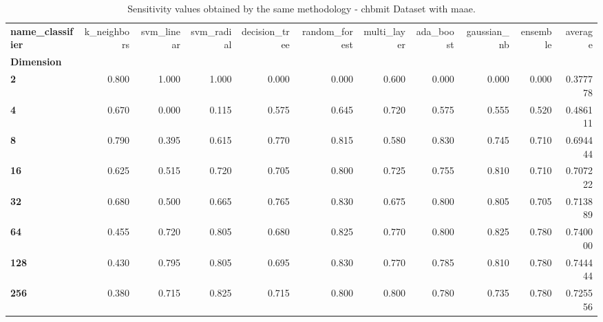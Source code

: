 \begin{table}
\centering
\caption{Sensitivity values obtained by the same methodology - chbmit Dataset with maae.}
\label{sensitivity_chbmit_maae-reproduction}
\begin{tabular}{lrrrrrrrrrr}
\toprule
\textbf{name\_classifier} &  k\_neighbors &  svm\_linear &  svm\_radial &  decision\_tree &  random\_forest &  multi\_layer &  ada\_boost &  gaussian\_nb &  ensemble &   average \\
\textbf{Dimension} &              &             &             &                &                &              &            &              &           &           \\
\midrule
\textbf{2        } &        0.800 &       1.000 &       1.000 &          0.000 &          0.000 &        0.600 &      0.000 &        0.000 &     0.000 &  0.377778 \\
\textbf{4        } &        0.670 &       0.000 &       0.115 &          0.575 &          0.645 &        0.720 &      0.575 &        0.555 &     0.520 &  0.486111 \\
\textbf{8        } &        0.790 &       0.395 &       0.615 &          0.770 &          0.815 &        0.580 &      0.830 &        0.745 &     0.710 &  0.694444 \\
\textbf{16       } &        0.625 &       0.515 &       0.720 &          0.705 &          0.800 &        0.725 &      0.755 &        0.810 &     0.710 &  0.707222 \\
\textbf{32       } &        0.680 &       0.500 &       0.665 &          0.765 &          0.830 &        0.675 &      0.800 &        0.805 &     0.705 &  0.713889 \\
\textbf{64       } &        0.455 &       0.720 &       0.805 &          0.680 &          0.825 &        0.770 &      0.800 &        0.825 &     0.780 &  0.740000 \\
\textbf{128      } &        0.430 &       0.795 &       0.805 &          0.695 &          0.830 &        0.770 &      0.785 &        0.810 &     0.780 &  0.744444 \\
\textbf{256      } &        0.380 &       0.715 &       0.825 &          0.715 &          0.800 &        0.800 &      0.780 &        0.735 &     0.780 &  0.725556 \\
\bottomrule
\end{tabular}
\end{table}
